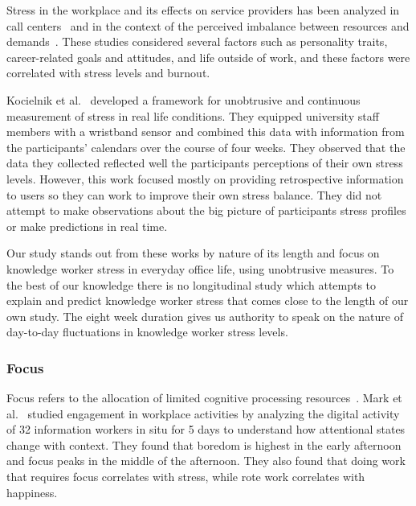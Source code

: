 Stress in the workplace and its effects on service providers has been analyzed in call centers~\cite{Hernandez11} and in the context of the perceived imbalance between resources and demands~\cite{cherniss80}. These studies considered several factors such as personality traits, career-related goals and attitudes, and life outside of work, and these factors were correlated with stress levels and burnout.

Kocielnik et al.~\cite{kocielnik_smart_2013} developed a framework for unobtrusive and continuous measurement of stress in real life conditions. They equipped university staff members with a wristband sensor and combined this data with information from the participants' calendars over the course of four weeks. They observed that the data they collected reflected well the participants perceptions of their own stress levels. However, this work focused mostly on providing retrospective information to users so they can work to improve their own stress balance. They did not attempt to make observations about the big picture of participants stress profiles or make predictions in real time.


Our study stands out from these works by nature of its length and focus on knowledge worker stress in everyday office life, using unobtrusive measures. To the best of our knowledge there is no longitudinal study which attempts to explain and predict knowledge worker stress that comes close to the length of our own study. The eight week duration gives us authority to speak on the nature of day-to-day fluctuations in knowledge worker stress levels.




\subsubsection{Focus}
Focus refers to the allocation of limited cognitive processing resources~\cite{Anderson04}.
Mark et al.~\cite{mark2014bored} studied engagement in workplace activities by analyzing the digital activity of 32 information workers in situ for 5 days to understand how attentional states change with context. They found that boredom is highest in the early afternoon and focus peaks in the middle of the afternoon. They also found that doing work that requires focus correlates with stress, while rote work correlates with happiness.

